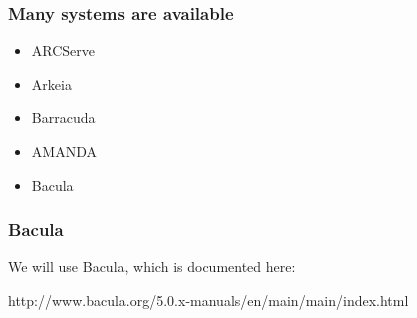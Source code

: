 \documentclass[10pt]{beamer}
\begin{document}
\begin{frame}
  \frametitle{Many systems are available}

\begin{itemize}
\item ARCServe
\item Arkeia
\item Barracuda
\item AMANDA
\item Bacula
\end{itemize}
\end{frame}

\begin{frame}
  \frametitle{Bacula}

  We will use Bacula, which is documented here:
  
  http://www.bacula.org/5.0.x-manuals/en/main/main/index.html

\end{frame}
\end{document}
